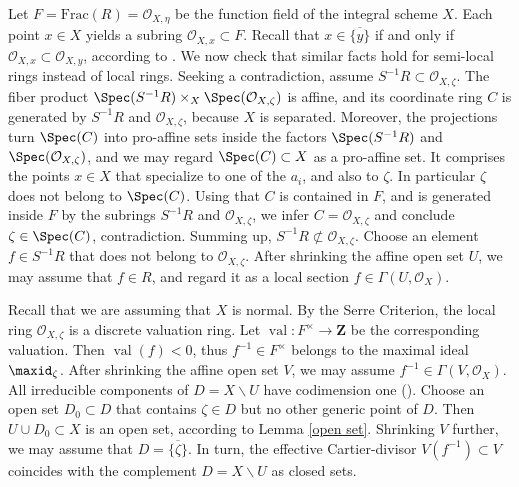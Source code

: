 \documentclass[12pt]{amsart}
\newcommand{\ra}{\rightarrow}
\newcommand{\val}{\operatorname{val}}
\begin{document}
Let $F=\text{Frac}(R)=\mathcal{O}_{X,\eta}$ be the function field of the integral scheme $X$. Each point $x\in X$
yields a   subring $\mathcal{O}_{X,x}\subset F$. Recall that  $x\in \overline{\{y\}}$
if and only if $\mathcal{O}_{X,x}\subset \mathcal{O}_{X,y}$, according to \cite[Cor. 8.5.7]{EGAI.2}.
We now check that similar facts hold for semi-local rings instead of local rings.
Seeking a contradiction, assume $S^{-1}R \subset \mathcal{O}_{X,\zeta}$.
The fiber product $\Spec(S^{-1}R)\times_X\Spec(\mathcal{O}_{X,\zeta})$ is affine, and its coordinate ring $C$
is generated by $S^{-1}R$ and $\mathcal{O}_{X,\zeta}$, because $X$ is separated. Moreover, the  projections turn $\Spec(C)$
into pro-affine sets inside the factors $\Spec(S^{-1}R)$ and $\Spec(\mathcal{O}_{X,\zeta})$, and we may regard $\Spec(C)\subset X$
as a pro-affine set. It comprises the points $x\in X$ that specialize to  one of the $a_i$, and also to $\zeta$.
In particular $\zeta$ does not belong to  $\Spec(C)$. Using that $C$ is contained in  $F$, and is generated inside $F$
by the subrings  $S^{-1}R$ and $\mathcal{O}_{X,\zeta}$, we infer  $C=\mathcal{O}_{X,\zeta}$ and conclude $\zeta\in\Spec(C)$, contradiction.
Summing up,  $S^{-1}R\not\subset \mathcal{O}_{X,\zeta}$.
Choose an element $f\in S^{-1}R$ that does not belong to $\mathcal{O}_{X,\zeta}$.
After shrinking the affine open set $U$, we may assume that $f\in R$, and  regard it as a local
section $f\in \Gamma(U,\mathcal{O}_X)$. 

Recall that we are assuming that $X$ is normal.
By the Serre Criterion, the local ring $\mathcal{O}_{X,\zeta}$ is a discrete valuation ring.
Let $\val:F^\times \ra \mathbf{Z}$ be the corresponding valuation. Then $\val(f)<0$,
thus $f^{-1}\in F^\times$ belongs to the maximal ideal $\maxid_\zeta$. After shrinking the affine open set $V$, we may 
assume $f^{-1}\in\Gamma(V,\mathcal{O}_X)$.
All irreducible components of $D=X\smallsetminus U$ have codimension one (\cite[Cor. 21.12.7]{EGAIV4}). Choose an open set $D_0\subset D$
that contains $\zeta\in D$ but no other generic point of $D$. Then   $U\cup D_0\subset X$ is an open set, according to Lemma \ref{open set}.
Shrinking $V$ further, we may assume that $D=\overline{\{\zeta\}}$. In turn, the effective Cartier-divisor $V(f^{-1})\subset V$
coincides with the complement $D=X\smallsetminus U$ as closed sets.
  
\end{document}
